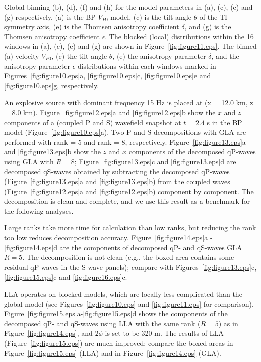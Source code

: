 \documentclass[manuscript,ulem,graphix,revised]{geophysics}
\begin{document}
 {
 \small{
Global binning (b), (d), (f) and (h) for the model parameters in (a), (c), (e) and (g) respectively.
 (a) is the BP $V_{P0}$ model, (c) is the tilt angle $\theta$ of the TI symmetry axis, (e) is the Thomsen anisotropy coefficient $\delta$, and (g) is the Thomsen anisotropy coefficient $\epsilon$. The blocked (local) distributions within the 16 windows in (a), (c), (e) and (g) are shown in Figure~\ref{fig:figure11.eps}.
}
}
 {
 The binned (a) velocity $V_{P0}$, (c) the tilt angle $\theta$, (e) the anisotropy parameter $\delta$, and the anisotropy parameter $\epsilon$ distributions within each windows marked in Figures~\ref{fig:figure10.eps}a, \ref{fig:figure10.eps}c, \ref{fig:figure10.eps}e and \ref{fig:figure10.eps}g, respectively.
}

An explosive source with dominant frequency 15 Hz is placed at (x = 12.0 km, z = 8.0 km). Figure~\ref{fig:figure12.eps}a and \ref{fig:figure12.eps}b show the $x$ and $z$ components of a (coupled P and S) wavefield snapshot at $t=2.4$ s in the BP model (Figure~\ref{fig:figure10.eps}a).
Two P and S decompositions with GLA are performed with rank = 5 and rank = 8, respectively.  
Figure~\ref{fig:figure13.eps}a and \ref{fig:figure13.eps}b show the  $z$ and $x$ components of the decomposed qP-waves using GLA with $R=8$; Figure~\ref{fig:figure13.eps}c and \ref{fig:figure13.eps}d are decomposed qS-waves obtained by subtracting the decomposed qP-waves (Figure~\ref{fig:figure13.eps}a and \ref{fig:figure13.eps}b) from the coupled waves (Figure~\ref{fig:figure12.eps}a and \ref{fig:figure12.eps}b) component by component. The decomposition is clean and complete, and we use this result as a benchmark for the following analyses. 

Large ranks take more time for calculation than low ranks, but reducing the rank too low reduces decomposition accuracy. Figure~\ref{fig:figure14.eps}a - \ref{fig:figure14.eps}d are the components of decomposed qP- and qS-waves GLA $R=5$. The decomposition is not clean (e.g., the boxed area contains some residual qP-waves in the S-wave panels); compare with Figures~\ref{fig:figure13.eps}c, \ref{fig:figure15.eps}c and \ref{fig:figure16.eps}c.


LLA operates on blocked models, which are locally less complicated than the global model (see Figures~\ref{fig:figure10.eps} and \ref{fig:figure11.eps} for comparison). Figure~\ref{fig:figure15.eps}a-\ref{fig:figure15.eps}d shows the components of the decomposed qP- and qS-waves using LLA with the same rank ($R=5$) as in Figure~\ref{fig:figure14.eps}, and $2\phi$ is set to be 320 m.
The results of LLA (Figure~\ref{fig:figure15.eps}) are much improved; compare the boxed areas in Figure~\ref{fig:figure15.eps} (LLA) and in Figure~\ref{fig:figure14.eps} (GLA). 
\end{document}
